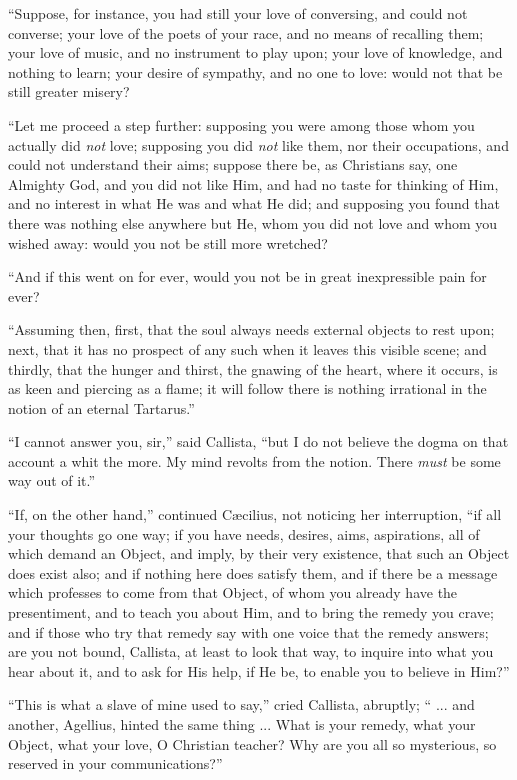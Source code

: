 ``Suppose, for instance, you had still your love of conversing,
and could not converse; your love of the poets of your race, and no
means of recalling them; your love of music, and no instrument to play
upon; your love of knowledge, and nothing to learn; your desire of
sympathy, and no one to love: would not that be still greater misery?

``Let me proceed a step further: supposing you were among those
whom you actually did \emph{not} love; supposing you did \emph{not}
like them, nor their occupations, and could not understand their aims;
suppose there be, as Christians say, one Almighty God, and you
did not like Him, and had no taste for thinking of Him, and no
interest in what He was and what He did; and supposing you found that
there was nothing else anywhere but He, whom you did not love and whom
you wished away: would you not be still more wretched?

``And if this went on for ever, would you not be in great
inexpressible pain for ever?

``Assuming then, first, that the soul always needs external
objects to rest upon; next, that it has no prospect of any such when
it leaves this visible scene; and thirdly, that the hunger and thirst,
the gnawing of the heart, where it occurs, is as keen and piercing as
a flame; it will follow there is nothing irrational in the notion of
an eternal Tartarus.''

``I cannot answer you, sir,'' said Callista, ``but I do
not believe the dogma on that account a whit the more. My mind revolts
from the notion. There \emph{must} be some way out of it.''

``If, on the other hand,'' continued Cæcilius, not
noticing her interruption, ``if all your thoughts go one way; if
you have needs, desires, aims, aspirations, all of which demand an
Object, and imply, by their very existence, that such an Object does
exist also; and if nothing here does satisfy them, and if there be a
message which professes to come from that Object, of whom you already
have the presentiment, and to teach you about Him, and to bring the
remedy you crave; and if those who try that remedy say with one voice
that the remedy answers; are you not bound, Callista, at least
to look that way, to inquire into what you hear about it, and to ask
for His help, if He be, to enable you to believe in Him?''

``This is what a slave of mine used to say,'' cried
Callista, abruptly; `` ... and another, Agellius, hinted the same
thing ... What is your remedy, what your Object, what your love, O
Christian teacher? Why are you all so mysterious, so reserved in your
communications?''

